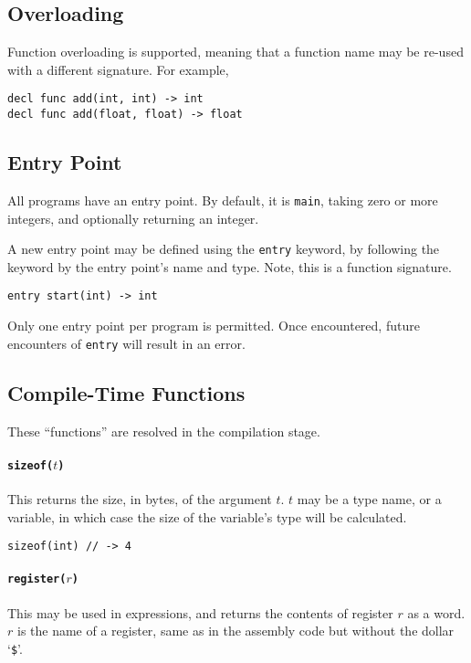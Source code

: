 \documentclass{article}
\begin{document}
\subsection{Overloading}

Function overloading is supported, meaning that a function name may be re-used with a different signature.
For example,

\begin{lstlisting}[language=CustomLang]
decl func add(int, int) -> int
decl func add(float, float) -> float
\end{lstlisting}

\subsection{Entry Point}

All programs have an entry point.
By default, it is \texttt{main}, taking zero or more integers, and optionally returning an integer.

A new entry point may be defined using the \texttt{entry} keyword, by following the keyword by the entry point's name and type.
Note, this is a function signature.

\begin{lstlisting}[language=CustomLang]
entry start(int) -> int
\end{lstlisting}

Only one entry point per program is permitted.
Once encountered, future encounters of \texttt{entry} will result in an error.

\subsection{Compile-Time Functions}

These ``functions'' are resolved in the compilation stage.

\paragraph*{\texttt{sizeof(\(t\))}}
This returns the size, in bytes, of the argument \(t\).
\(t\) may be a type name, or a variable, in which case the size of the variable's type will be calculated.

\begin{lstlisting}[language=CustomLang]
sizeof(int) // -> 4
\end{lstlisting}

\paragraph*{\texttt{register(\(r\))}}
This may be used in expressions, and returns the contents of register \(r\) as a word.
\(r\) is the name of a register, same as in the assembly code but without the dollar `\texttt{\$}'.
\end{document}

